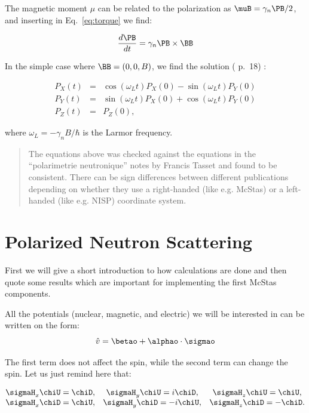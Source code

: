 The magnetic moment $\mu$ can be related to the polarization as $\muB
= \gamma_n \PB/2$, and inserting in Eq.~\ref{eq:torque} we find:

\begin{equation}
  \label{eq:pol_magnetic}
  \frac{d\PB}{dt} = \gamma_n \PB \times \BB
\end{equation}

In the simple case where $\BB = (0, 0, B)$, we find the solution
(\cite{gavin} p.~18) :

\begin{eqnarray}
  \nonumber
  P_X(t) & = & \cos(\omega_L t) P_X(0) - \sin(\omega_L t) P_Y(0) \\
  \label{eq:precession}
  P_Y(t) & = & \sin(\omega_L t) P_X(0) + \cos(\omega_L t) P_Y(0) \\
  \nonumber
  P_Z(t) & = & P_Z(0),
\end{eqnarray}

where $\omega_L = -\gamma_n B/\hbar$ is the Larmor frequency.\\

\begin{quote}
  The equations above was checked against the equations in the ``polarimetrie
  neutronique'' notes by Francis Tasset and found to be consistent. There can
  be sign differences between different publications depending on whether they
  use a right-handed (like e.g. McStas) or a left-handed (like e.g. NISP)
  coordinate system.
\end{quote}

\section{Polarized Neutron Scattering}
\label{sec:scat}

First we will give a short introduction to how calculations are done
and then quote some results which are important for implementing the
first McStas components.

All the potentials (nuclear, magnetic, and electric) we will be interested in
can be written on the form:
\begin{equation}
  \label{eq:general_pot}
  \hat{v} = \betao + \alphao \cdot \sigmao
\end{equation}

The first term does not affect the spin, while the second term can
change the spin. Let us just remind here that:

\begin{equation}
  \label{eq:pauli_rules}
  \begin{matrix}
    \sigmaH_x \chiU = \chiD, &
    \sigmaH_y \chiU = i\chiD, &
    \sigmaH_z \chiU = \chiU, \\
    \sigmaH_x \chiD = \chiU, &
    \sigmaH_y \chiD = -i\chiU, &
    \sigmaH_z \chiD = -\chiD.
  \end{matrix}
\end{equation}

